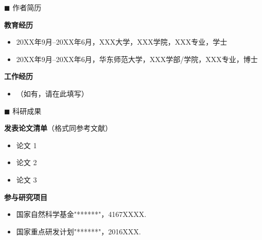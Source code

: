 \begin{center}
  \large\bfseries{}
\end{center}
\vskip 5mm

{\heiti $\blacksquare$ 作者简历}\vskip 5mm

\noindent\textbf{教育经历}

\begin{itemize}
  \item 20XX年9月--20XX年6月，XXX大学，XXX学院，XXX专业，学士
  \item 20XX年9月--20XX年6月，华东师范大学，XXX学部/学院，XXX专业，博士
\end{itemize}

\noindent\textbf{工作经历}

\begin{itemize}
  \item （如有，请在此填写）
\end{itemize}

\bigskip\bigskip

{\heiti $\blacksquare$ 科研成果}\vskip 5mm

\noindent\textbf{发表论文清单}（格式同参考文献）

\begin{itemize}
  \item 论文 1
  \item 论文 2
  \item 论文 3
\end{itemize}

\bigskip

\noindent\textbf{参与研究项目}

\begin{itemize}
  \item 国家自然科学基金"******"，4167XXXX.
  \item 国家重点研发计划"******"，2016XXX.
\end{itemize}
